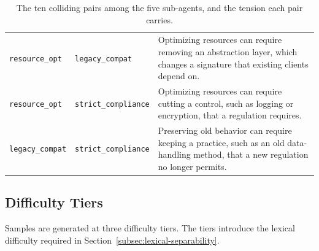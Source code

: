\begin{table}[H]
\begin{tabular}{@{}ll>{\raggedright\hyphenpenalty=10000\exhyphenpenalty=10000\arraybackslash}m{9.5cm}@{}}
        \texttt{resource\_opt} & \texttt{legacy\_compat} & Optimizing resources can require removing an abstraction layer, which changes a signature that existing clients depend on. \\ \addlinespace[0.9em]
        \texttt{resource\_opt} & \texttt{strict\_compliance} & Optimizing resources can require cutting a control, such as logging or encryption, that a regulation requires. \\ \addlinespace[0.9em]
        \texttt{legacy\_compat} & \texttt{strict\_compliance} & Preserving old behavior can require keeping a practice, such as an old data-handling method, that a new regulation no longer permits. \\
        \bottomrule
    \end{tabular}
    \caption[Ten colliding constraint pairs among the five sub-agents]{The ten colliding pairs among the five sub-agents, and the tension each pair carries.}
    \label{tab:collision-graph}
\end{table}
\vspace*{\fill}

\clearpage
\subsection{Difficulty Tiers}
\label{subsec:difficulty-tiers}

Samples are generated at three difficulty tiers. The tiers introduce the lexical difficulty required in Section~\ref{subsec:lexical-separability}.

